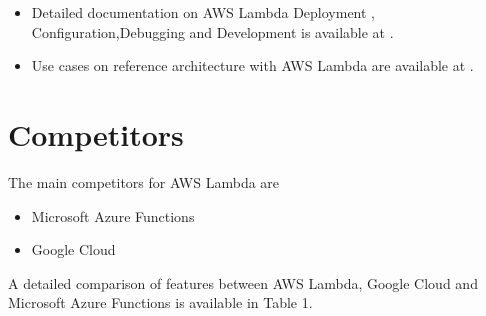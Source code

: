 \documentclass[9pt,twocolumn,twoside]{../../styles/osajnl}
\begin{document}
\begin{itemize}
\renewcommand{\labelitemi}{\scriptsize$\bullet$} 
\item Detailed documentation on AWS Lambda  Deployment , 
Configuration,Debugging and Development is available at \cite{www-AWSLambdaDoc}.
\item Use cases on reference architecture with  AWS Lambda are available at 
\cite{www-AWSLambdaUseCase}. 
\end{itemize}

\section{Competitors}

The main competitors for AWS Lambda are
\begin{itemize}
\renewcommand{\labelitemi}{\scriptsize$\bullet$} 
\item Microsoft Azure Functions
\item Google Cloud
\end{itemize}

A detailed comparison of features between AWS Lambda, Google Cloud and 
Microsoft Azure Functions is available in Table 1.
\end{document}
